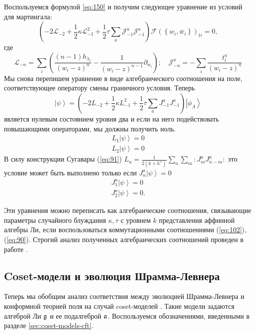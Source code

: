 Воспользуемся формулой \eqref{eq:150} и получим следующее уравнение из условий для мартингала:
\begin{equation}
  \left(-2 \mathcal{L}_{-2}+\frac{1}{2}\kappa \mathcal{L}_{-1}^{2}+\frac{1}{2}\tau\sum_{a} \mathcal{J}^{a}_{-1} \mathcal{J}^{a}_{-1}\right)        \mathcal{F}(\left\{w_{i}, \bar w_{i}\right\})_{\mathbb{H}}=0,
  \label{eq:167}
\end{equation}
где
\begin{equation*}
  \mathcal{L}_{-n}=\sum_{i}\left(\frac{(n-1)h_{\lambda_{i}}}{(w_{i}-z)^{n}}-\frac{1}{(w_{i}-z)^{n-1}}\partial_{w_{i}}\right);\quad \mathcal{J}^{a}_{{-n}}=-\sum_{i}\frac{t^{a}_{i}}{(w_{i}-z)^{n}}
\end{equation*}
Мы снова перепишем уравнение в виде алгебраического соотношения на поле, соответствующее оператору смены граничного условия. Теперь
\begin{equation}
  \left| \psi\right>=\left(-2 L_{-2}+\frac{1}{2}\kappa L_{-1}^{2}+\frac{1}{2}\tau\sum_{a} J^{a}_{-1} J^{a}_{-1}\right) \left|\phi_{\Lambda}\right>    
  \label{eq:16}
\end{equation}
является нулевым состоянием уровня два и если на него подействовать повышающими операторами, мы должны получить ноль.
\begin{eqnarray}
  L_{1}\left|\psi\right>=0\\
  L_{2}\left|\psi\right>=0
\end{eqnarray}
В силу конструкции Сугавары (\ref{eq:91}) $  L_n=\frac{1}{2(k+h^{\vee})}\sum_a\sum_m:J^a_m J^a_{n-m}:$ это условие может быть выполнено только если $J^{a}_{n} \left|\psi\right>=0$
\begin{eqnarray}
    J^{a}_{1} \left|\psi\right>=0\\
    J^{a}_{2}\left|\psi\right>=0.
\end{eqnarray}

Эти уравнения можно переписать как алгебраические соотношения, связывающие параметры случайного блуждания $\kappa, \tau$ с уровнем  $k$ представления аффинной алгебры Ли, если воспользоваться коммутационными соотношениями  (\ref{eq:102}), (\ref{eq:90}). Строгий анализ полученных алгебраических соотношений проведен в работе \cite{alekseev2010sle}.

\subsection{Coset-модели и эволюция Шрамма-Левнера}
\label{sec:coset-models-sle}
Теперь мы обобщим анализ соответствия между эволюцией Шрамма-Левнера и конформной теорией поля на случай coset-моделей \cite{Goddard198588}. Такие модели задаются алгеброй Ли $\mathfrak{g}$ и ее подалгеброй $\mathfrak{a}$. Воспользуемся обозначениями, введенными в разделе \ref{sec:coset-models-cft}.

